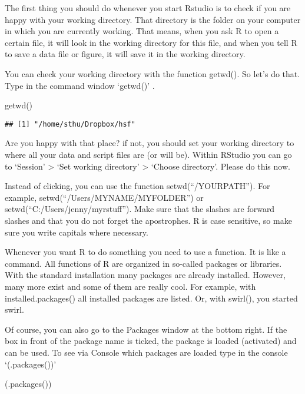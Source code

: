 \documentclass[
]{article}
\newenvironment{Shaded}{\begin{snugshade}}{\end{snugshade}}
\newcommand{\FunctionTok}[1]{\textcolor[rgb]{0.00,0.00,0.00}{#1}}
\newcommand{\NormalTok}[1]{#1}
\begin{document}
The first thing you should do whenever you start Rstudio is to check if
you are happy with your working directory. That directory is the folder
on your computer in which you are currently working. That means, when
you ask R to open a certain file, it will look in the working directory
for this file, and when you tell R to save a data file or figure, it
will save it in the working directory.

You can check your working directory with the function getwd(). So let's
do that. Type in the command window `getwd()' .

\begin{Shaded}
\begin{Highlighting}[]
\FunctionTok{getwd}\NormalTok{()}
\end{Highlighting}
\end{Shaded}

\begin{verbatim}
## [1] "/home/sthu/Dropbox/hsf"
\end{verbatim}

Are you happy with that place? if not, you should set your working
directory to where all your data and script files are (or will be).
Within RStudio you can go to `Session' \textgreater{} `Set working
directory' \textgreater{} `Choose directory'. Please do this now.

Instead of clicking, you can use the function setwd(``/YOURPATH''). For
example, setwd(``/Users/MYNAME/MYFOLDER'') or
setwd(``C:/Users/jenny/myrstuff''). Make sure that the slashes are
forward slashes and that you do not forget the apostrophes. R is case
sensitive, so make sure you write capitals where necessary.

Whenever you want R to do something you need to use a function. It is
like a command. All functions of R are organized in so-called packages
or libraries. With the standard installation many packages are already
installed. However, many more exist and some of them are really cool.
For example, with installed.packages() all installed packages are
listed. Or, with swirl(), you started swirl.

Of course, you can also go to the Packages window at the bottom right.
If the box in front of the package name is ticked, the package is loaded
(activated) and can be used. To see via Console which packages are
loaded type in the console `(.packages())'

\begin{Shaded}
\begin{Highlighting}[]
\NormalTok{(}\FunctionTok{.packages}\NormalTok{())}
\end{Highlighting}
\end{Shaded}
\end{document}
